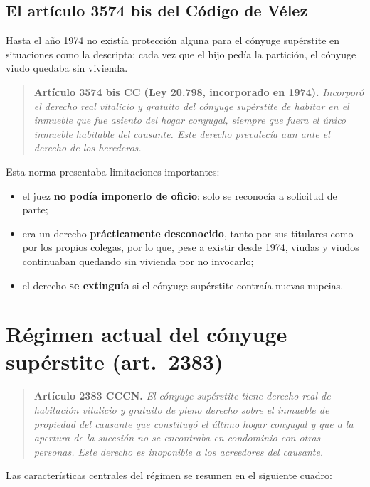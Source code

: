 \documentclass[12pt,oneside]{book}
\begin{document}
\subsection{El artículo 3574 bis del Código de Vélez}

Hasta el año 1974 no existía protección alguna para el cónyuge supérstite en situaciones como la descripta: cada vez que el hijo pedía la partición, el cónyuge viudo quedaba sin vivienda.

\begin{quote}
\textbf{Artículo 3574 bis CC (Ley 20.798, incorporado en 1974).} \textit{Incorporó el derecho real vitalicio y gratuito del cónyuge supérstite de habitar en el inmueble que fue asiento del hogar conyugal, siempre que fuera el único inmueble habitable del causante. Este derecho prevalecía aun ante el derecho de los herederos.}
\end{quote}

Esta norma presentaba limitaciones importantes:

\begin{itemize}
    \item el juez \textbf{no podía imponerlo de oficio}: solo se reconocía a solicitud de parte;
    \item era un derecho \textbf{prácticamente desconocido}, tanto por sus titulares como por los propios colegas, por lo que, pese a existir desde 1974, viudas y viudos continuaban quedando sin vivienda por no invocarlo;
    \item el derecho \textbf{se extinguía} si el cónyuge supérstite contraía nuevas nupcias.
\end{itemize}

\section{Régimen actual del cónyuge supérstite (art.~2383)}

\begin{quote}
\textbf{Artículo 2383 CCCN.} \textit{El cónyuge supérstite tiene derecho real de habitación vitalicio y gratuito de pleno derecho sobre el inmueble de propiedad del causante que constituyó el último hogar conyugal y que a la apertura de la sucesión no se encontraba en condominio con otras personas. Este derecho es inoponible a los acreedores del causante.}
\end{quote}

Las características centrales del régimen se resumen en el siguiente cuadro:
\end{document}
